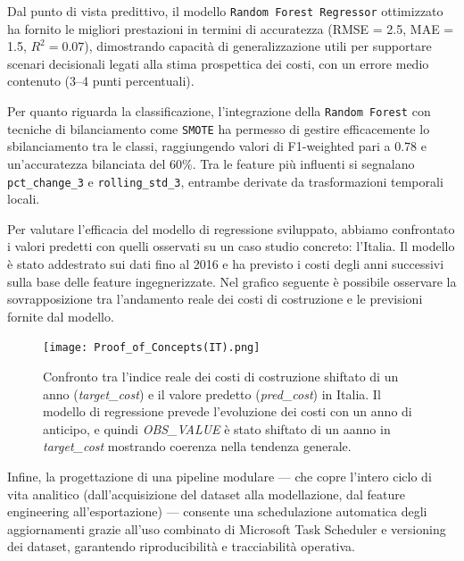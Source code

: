 \documentclass[conference]{IEEEtran}
\begin{document}
Dal punto di vista predittivo, il modello \texttt{Random Forest Regressor} ottimizzato ha fornito le migliori prestazioni in termini di accuratezza (RMSE = 2.5, MAE = 1.5, $R^2 = 0.07$), dimostrando capacità di generalizzazione utili per supportare scenari decisionali legati alla stima prospettica dei costi, con un errore medio contenuto (3–4 punti percentuali).

Per quanto riguarda la classificazione, l’integrazione della \texttt{Random Forest} con tecniche di bilanciamento come \texttt{SMOTE} ha permesso di gestire efficacemente lo sbilanciamento tra le classi, raggiungendo valori di F1-weighted pari a 0.78 e un'accuratezza bilanciata del 60\%. Tra le feature più influenti si segnalano \texttt{pct\_change\_3} e \texttt{rolling\_std\_3}, entrambe derivate da trasformazioni temporali locali.

Per valutare l’efficacia del modello di regressione sviluppato, abbiamo confrontato i valori predetti con quelli osservati su un caso studio concreto: l’Italia. Il modello è stato addestrato sui dati fino al 2016 e ha previsto i costi degli anni successivi sulla base delle feature ingegnerizzate. Nel grafico seguente è possibile osservare la sovrapposizione tra l’andamento reale dei costi di costruzione e le previsioni fornite dal modello.

\begin{figure}[H]
\centering
\texttt{[image: Proof\_of\_Concepts(IT).png]}
\caption{Confronto tra l’indice reale dei costi di costruzione shiftato di un anno (\textit{target\_cost}) e il valore predetto (\textit{pred\_cost}) in Italia. Il modello di regressione prevede l’evoluzione dei costi con un anno di anticipo, e quindi \textit{OBS\_VALUE} è stato shiftato di un aanno in \textit{target\_cost} mostrando coerenza nella tendenza generale.}
\label{fig:proof-of-concepts}
\end{figure}

Infine, la progettazione di una pipeline modulare — che copre l’intero ciclo di vita analitico (dall’acquisizione del dataset alla modellazione, dal feature engineering all’esportazione) — consente una schedulazione automatica degli aggiornamenti grazie all’uso combinato di Microsoft Task Scheduler e versioning dei dataset, garantendo riproducibilità e tracciabilità operativa.
\end{document}
